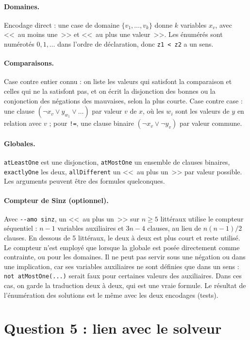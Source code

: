 \documentclass[11pt,a4paper]{article}
\newcommand{\f}[1]{\texttt{#1}}
\begin{document}
\paragraph{Domaines.} Encodage direct : une case de domaine $\{v_1,\dots,v_k\}$ donne $k$ variables $x_{v}$, avec <<~au moins une~>> et <<~au plus une valeur~>>. Les énumérés sont numérotés $0,1,\dots$ dans l'ordre de déclaration, donc \f{z1 < z2} a un sens.

\paragraph{Comparaisons.} Case contre entier connu : on liste les valeurs qui satisfont la comparaison et celles qui ne la satisfont pas, et on écrit la disjonction des bonnes ou la conjonction des négations des mauvaises, selon la plus courte. Case contre case : une clause $(\neg x_v \vee y_{w_1}\vee\dots)$ par valeur $v$ de $x$, où les $w_i$ sont les valeurs de $y$ en relation avec $v$ ; pour \f{!=}, une clause binaire $(\neg x_v\vee\neg y_v)$ par valeur commune.

\paragraph{Globales.} \f{atLeastOne} est une disjonction, \f{atMostOne} un ensemble de clauses binaires, \f{exactlyOne} les deux, \f{allDifferent} un <<~au plus un~>> par valeur possible. Les arguments peuvent être des formules quelconques.

\paragraph{Compteur de Sinz (optionnel).} Avec \f{-{}-amo sinz}, un <<~au plus un~>> sur $n\ge 5$ littéraux utilise le compteur séquentiel : $n-1$ variables auxiliaires et $3n-4$ clauses, au lieu de $n(n-1)/2$ clauses. En dessous de 5 littéraux, le deux à deux est plus court et reste utilisé. Le compteur n'est employé que lorsque la globale est posée directement comme contrainte, ou pour les domaines. Il ne peut pas servir sous une négation ou dans une implication, car ses variables auxiliaires ne sont définies que dans un sens : \f{not atMostOne(...)} serait faux pour certaines valeurs des auxiliaires. Dans ces cas, on garde la traduction deux à deux, qui est une vraie formule. Le résultat de l'énumération des solutions est le même avec les deux encodages (tests).

\section*{Question 5 : lien avec le solveur}
\end{document}
